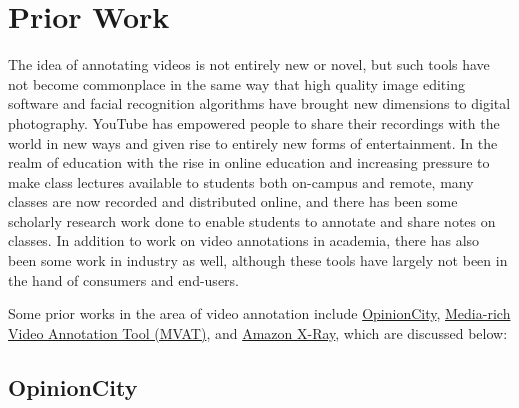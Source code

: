 
\chapter{Prior Work}
\label{sec:priorwork}


The idea of annotating videos is not entirely new or novel, but such tools have not become commonplace in the same way that high quality image editing software and facial recognition algorithms have brought new dimensions to digital photography.  YouTube has empowered people to share their recordings with the world in new ways and given rise to entirely new forms of entertainment.  In the realm of education with the rise in online education and increasing pressure to make class lectures available to students both on-campus and remote, many classes are now recorded and distributed online, and there has been some scholarly research work done to enable students to annotate and share notes on classes.  In addition to work on video annotations in academia, there has also been some work in industry as well, although these tools have largely not been in the hand of consumers and end-users.

Some prior works in the area of video annotation include \hyperref[sec:priorwork:opinioncity]{OpinionCity}, \hyperref[sec:priorwork:media-rich-video-annotation-tool]{Media-rich Video Annotation Tool (MVAT)}, and \hyperref[sec:priorwork:amazon-x-ray]{Amazon X-Ray}, which are discussed below:



\section{OpinionCity}
\label{sec:priorwork:opinioncity}

